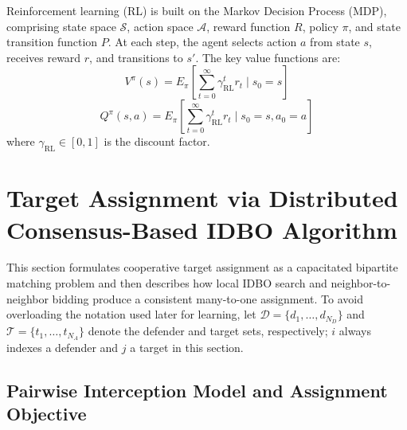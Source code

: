 \documentclass[lettersize,journal]{IEEEtran}
\begin{document}
Reinforcement learning (RL) is built on the Markov Decision Process (MDP), comprising state
space $\mathcal{S}$, action space $\mathcal{A}$, reward function $R$, policy $\pi$, and state
transition function $P$.
At each step, the agent selects action $a$ from state $s$, receives reward $r$, and
transitions to $s'$.
The key value functions are:
\begin{equation}
\label{RLV}
V^{\pi}(s)=E_{\pi}\left[\sum_{t=0}^{\infty}\gamma_{\mathrm{RL}}^{t}r_{t}\mid s_{0}=s\right]
\end{equation}
\begin{equation}
\label{RLQ}
Q^{\pi}(s,a)=E_{\pi}\left[\sum_{t=0}^{\infty}\gamma_{\mathrm{RL}}^{t}r_{t}\mid s_{0}=s,a_{0}=a\right]
\end{equation}
where $\gamma_{\mathrm{RL}}\in[0,1]$ is the discount factor.






\begingroup\color{blue}
\section{Target Assignment via Distributed Consensus-Based IDBO Algorithm}
\label{sec:target_assignment}

This section formulates cooperative target assignment as a capacitated bipartite matching
problem and then describes how local IDBO search and neighbor-to-neighbor bidding produce a
consistent many-to-one assignment. To avoid overloading the notation used later for learning,
let $\mathcal{D}=\{d_1,\ldots,d_{N_D}\}$ and
$\mathcal{T}=\{t_1,\ldots,t_{N_A}\}$ denote the defender and target sets, respectively;
$i$ always indexes a defender and $j$ a target in this section.

\subsection{Pairwise Interception Model and Assignment Objective}
\label{subsec:problem_formulation}
\end{document}
